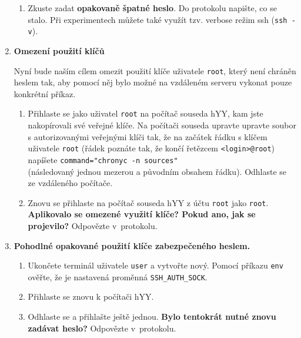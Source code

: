 \documentclass[a4paper,11pt]{article}
\begin{document}
\begin{enumerate}
\begin{enumerate}
      \item Zkuste zadat \textbf{opakovaně špatné heslo}. Do protokolu napište, co se stalo.
      Při experimentech můžete také využít tzv. verbose režim ssh (\texttt{ssh -v}).

    \end{enumerate}

  \item {\bf Omezení použití klíčů}

    Nyní bude naším cílem omezit použití klíče uživatele {\tt root}, který není chráněn heslem tak,
    aby pomocí něj bylo možné na vzdáleném serveru vykonat pouze konkrétní příkaz.

    \begin{enumerate}

      \item Přihlaste se jako uživatel {\tt root} na počítač souseda hYY, kam jste nakopírovali své veřejné klíče. Na počítači souseda upravte
        upravte soubor s autorizovanými veřejnými klíči tak, že na začátek
        řádku s klíčem uživatele {\tt root} (řádek poznáte tak, že končí řetězcem
        {\tt <login>@root}) napíšete
        \verb|command="chronyc -n sources" | \\ (následovaný jednou mezerou a původním
        obsahem řádku).
        Odhlaste se ze vzdáleného počítače.

      \item Znovu se přihlaste na počítač souseda hYY z
        účtu \texttt{root} jako \texttt{root}.  \textbf{Aplikovalo se
        omezené využití klíče? Pokud ano, jak se projevilo?} Odpovězte v~protokolu.

    \end{enumerate}


  \item {\bf Pohodlné opakované použití klíče zabezpečeného heslem.}

    \begin{enumerate}

      \item Ukončete terminál uživatele {\tt user} a vytvořte nový. Pomocí
        příkazu \verb|env| ověřte, že je nastavená proměnná
        \verb|SSH_AUTH_SOCK|.

      \item Přihlaste se znovu k počítači hYY.

      \item Odhlaste se a přihlašte ještě jednou. \textbf{Bylo tentokrát nutné znovu zadávat heslo?}
      Odpovězte v~protokolu.


    \end{enumerate}


\end{enumerate}
\end{document}
